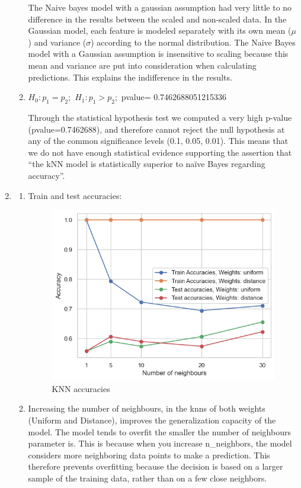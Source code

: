 \documentclass{article}
\begin{document}
\begin{enumerate}[leftmargin=\labelsep]
\begin{enumerate}
The Naive bayes model with a gaussian assumption had very little to no difference in the results between the scaled and non-scaled data. In the Gaussian model, each feature is modeled separately with its own mean ($\mu$) and variance ($\sigma$) according to the normal distribution. The Naive Bayes model with a Gaussian assumption is insensitive to scaling because this mean and variance are put into consideration when calculating predictions. This explains the indifference in the results.

\item
$H_0: p_1 = p_2;$ $H_1: p_1>p_2;$ pvalue= 0.7462688051215336

Through the statistical hypothesis test we computed a very high
p-value (pvalue=0.7462688), and therefore cannot reject the null
hypothesis at any of the common significance levels (0.1, 0.05, 0.01).
This means that we do not have enough statistical evidence supporting
the assertion that “the kNN model is statistically superior to naïve
Bayes regarding accuracy”.


\end{enumerate}
\item \begin{enumerate}
\item
Train and test accuracies:

    \begin{figure}[H]
        \centering
        \includegraphics[width=0.8\linewidth]{img/knn_accs.png}
        \caption{KNN accuracies}
        \label{fig:enter-label}
    \end{figure}

\item 
Increasing the number of neighbours, in the knns of both weights (Uniform and Distance), improves the generalization capacity of the model. The model tends to overfit the smaller the number of neighbours parameter is. This is because when you increase n\_neighbors, the model considers more neighboring data points to make a prediction. This therefore prevents overfitting because the decision is based on a larger sample of the training data, rather than on a few close neighbors.


\end{enumerate}
\end{enumerate}
\end{document}
